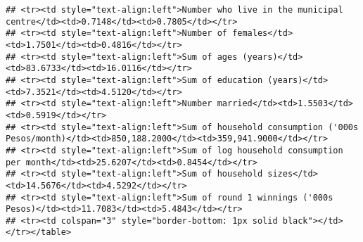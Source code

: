 \documentclass[]{tufte-handout}
\begin{document}
\begin{verbatim}
## <tr><td style="text-align:left">Number who live in the municipal centre</td><td>0.7148</td><td>0.7805</td></tr>
## <tr><td style="text-align:left">Number of females</td><td>1.7501</td><td>0.4816</td></tr>
## <tr><td style="text-align:left">Sum of ages (years)</td><td>83.6733</td><td>16.0116</td></tr>
## <tr><td style="text-align:left">Sum of education (years)</td><td>7.3521</td><td>4.5120</td></tr>
## <tr><td style="text-align:left">Number married</td><td>1.5503</td><td>0.5919</td></tr>
## <tr><td style="text-align:left">Sum of household consumption ('000s Pesos/month)</td><td>850,188.2000</td><td>359,941.9000</td></tr>
## <tr><td style="text-align:left">Sum of log household consumption per month</td><td>25.6207</td><td>0.8454</td></tr>
## <tr><td style="text-align:left">Sum of household sizes</td><td>14.5676</td><td>4.5292</td></tr>
## <tr><td style="text-align:left">Sum of round 1 winnings ('000s Pesos)</td><td>11.7083</td><td>5.4843</td></tr>
## <tr><td colspan="3" style="border-bottom: 1px solid black"></td></tr></table>
\end{verbatim}
\end{document}
